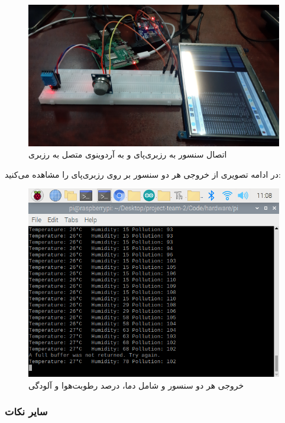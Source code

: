 \documentclass[12pt]{article}
\begin{document}
\begin{itemize}
	
		\begin{figure}[H]
		\begin{center}
			\includegraphics[width=.70\textwidth]{images/dhtmq2.jpg}
		\end{center}
		\caption{اتصال سنسور    به رزبری‌پای و  به آردوینوی متصل به رزبری}
	\end{figure}
	

	
	در ادامه تصویری از خروجی هر دو سنسور بر روی رزبری‌پای را مشاهده می‌کنید:
	
	
		
	\begin{figure}[H]
		\begin{center}
			\includegraphics[width=.70\textwidth]{images/envsensor.png}
		\end{center}
		\caption{خروجی هر دو سنسور  و  شامل دما، درصد رطوبت‌هوا و آلودگی}
	\end{figure}

	
	

	
	
	
\end{itemize}

\subsubsection{سایر نکات}
\end{document}
